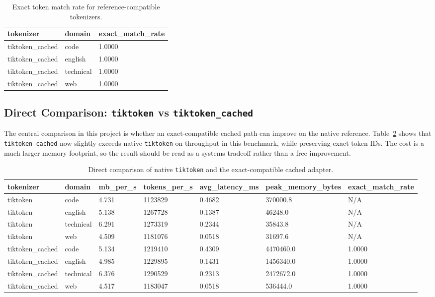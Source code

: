 \documentclass[11pt]{article}
\begin{document}
\begin{table}[H]
\centering
\begin{tabular}{lll}
\toprule
tokenizer & domain & exact\_match\_rate \\
\midrule
tiktoken\_cached & code & 1.0000 \\
tiktoken\_cached & english & 1.0000 \\
tiktoken\_cached & technical & 1.0000 \\
tiktoken\_cached & web & 1.0000 \\
\bottomrule
\end{tabular}
\caption{Exact token match rate for reference-compatible tokenizers.}
\label{tab:exact}
\end{table}

\subsection{Direct Comparison: \texttt{tiktoken} vs \texttt{tiktoken\_cached}}
The central comparison in this project is whether an exact-compatible cached path can improve on the native reference. Table~\ref{tab:direct} shows that \texttt{tiktoken\_cached} now slightly exceeds native \texttt{tiktoken} on throughput in this benchmark, while preserving exact token IDs. The cost is a much larger memory footprint, so the result should be read as a systems tradeoff rather than a free improvement.

\begin{table}[H]
\centering
\begin{tabular}{lllllll}
\toprule
tokenizer & domain & mb\_per\_s & tokens\_per\_s & avg\_latency\_ms & peak\_memory\_bytes & exact\_match\_rate \\
\midrule
tiktoken & code & 4.731 & 1123829 & 0.4682 & 370000.8 & N/A \\
tiktoken & english & 5.138 & 1267728 & 0.1387 & 46248.0 & N/A \\
tiktoken & technical & 6.291 & 1273319 & 0.2344 & 35843.8 & N/A \\
tiktoken & web & 4.509 & 1181076 & 0.0518 & 31697.6 & N/A \\
tiktoken\_cached & code & 5.134 & 1219410 & 0.4309 & 4470460.0 & 1.0000 \\
tiktoken\_cached & english & 4.985 & 1229895 & 0.1431 & 1456340.0 & 1.0000 \\
tiktoken\_cached & technical & 6.376 & 1290529 & 0.2313 & 2472672.0 & 1.0000 \\
tiktoken\_cached & web & 4.517 & 1183047 & 0.0518 & 536444.0 & 1.0000 \\
\bottomrule
\end{tabular}
\caption{Direct comparison of native \texttt{tiktoken} and the exact-compatible cached adapter.}
\label{tab:direct}
\end{table}
\end{document}
